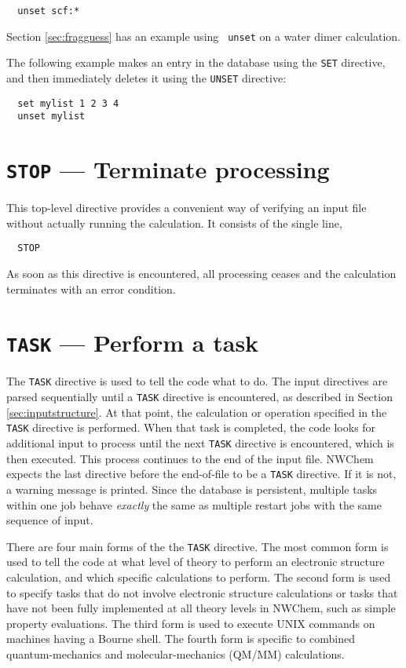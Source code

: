\begin{verbatim}
  unset scf:*
\end{verbatim}

Section \ref{sec:fragguess} has an example  using
\verb+ unset+ on a water dimer calculation.

The following example makes an entry in the database using the
\verb+SET+ directive, and then immediately deletes it using the
\verb+UNSET+ directive:

\begin{verbatim}
  set mylist 1 2 3 4
  unset mylist
\end{verbatim}


\section{{\tt STOP} --- Terminate processing}

This top-level directive provides a convenient way of verifying 
an input file without actually running the calculation.  It consists 
of the single line,

\begin{verbatim}
  STOP
\end{verbatim}

As soon as this directive is encountered, all processing ceases and
the calculation terminates with an error condition.

\section{{\tt TASK} --- Perform a task}
\label{sec:task}

The \verb+TASK+ directive is used to tell the code what to do.  The
input directives are parsed sequentially until a \verb+TASK+ directive
is encountered, as described in Section \ref{sec:inputstructure}.  At
that point, the calculation or operation specified in the \verb+TASK+
directive is performed.  When that task is completed, the code looks
for additional input to process until the next \verb+TASK+ directive
is encountered, which is then executed.  This process continues to the
end of the input file.  NWChem expects the last directive before the
end-of-file to be a \verb+TASK+ directive.  If it is not, a warning
message is printed.  Since the database is persistent, multiple tasks
within one job behave {\em exactly} the same as multiple restart jobs
with the same sequence of input.

There are four main forms of the the \verb+TASK+ directive.  The most
common form is used to tell the code at what level of theory to
perform an electronic structure calculation, and which specific
calculations to perform.  The second form is used to specify tasks
that do not involve electronic structure calculations or tasks that
have not been fully implemented at all theory levels in NWChem, such
as simple property evaluations.  The third form is used to execute
UNIX commands on machines having a Bourne shell.  The fourth form is
specific to combined quantum-mechanics and molecular-mechanics (QM/MM)
calculations.

